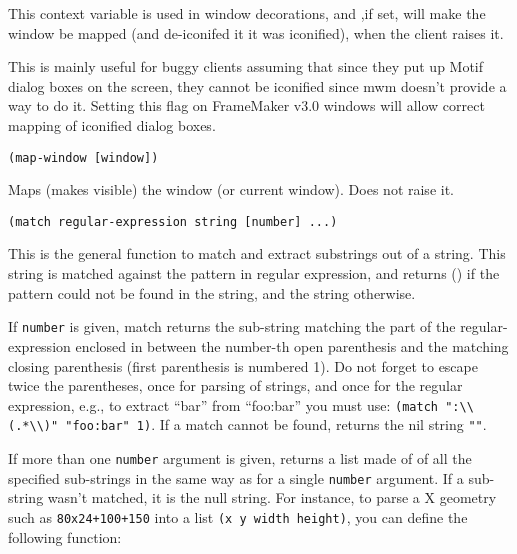 
This context variable is used in window decorations, and ,if set, will make
the window be mapped (and de-iconifed it it was iconified), when the client
raises it. 

This is mainly useful for buggy clients assuming that since they put up Motif
dialog boxes on the screen, they cannot be iconified since mwm doesn't provide
a way to do it. Setting this flag on FrameMaker v3.0 windows will allow
correct mapping of iconified dialog boxes.

        
{\usagefont\begin{verbatim}
(map-window [window])
\end{verbatim}}\usageupspace

Maps (makes visible) the window (or current window). Does not raise it.

        
{\usagefont\begin{verbatim}
(match regular-expression string [number] ...)
\end{verbatim}}\usageupspace

This is the general function to match and extract substrings out of a {\WOOL}
string. This string is matched against the pattern in regular expression,
and returns () if the pattern could not be found in the string, and the
string otherwise.

If \verb"number" is given, match returns the sub-string 
matching the part of the
regular-expression enclosed in between the number-th open parenthesis and
the matching closing  parenthesis (first parenthesis is numbered 1). Do not
forget to escape twice the parentheses, once for {\GWM} parsing of strings, and
once for the regular expression, e.g., to extract ``bar'' from ``foo:bar'' you
must use: \verb|(match ":\\(.*\\)" "foo:bar" 1)|. If a match cannot be found,
returns the nil string \verb|""|.

If more than one \verb"number" argument is given, returns a list made of
of all the specified sub-strings in the same way as for a single \verb"number"
argument. If a sub-string wasn't matched, it is the null string.
For instance, to parse a X geometry such as \verb"80x24+100+150"
into a list \verb"(x y width height)", you can define the following function:

